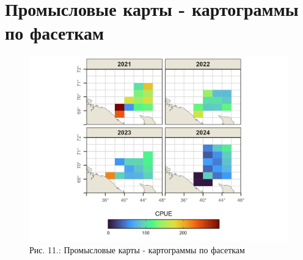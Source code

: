 \documentclass[
  letterpaper,
  DIV=11,
  numbers=noendperiod]{scrreprt}
\begin{document}
\section{Промысловые карты - картограммы по
фасеткам}\label{ux43fux440ux43eux43cux44bux441ux43bux43eux432ux44bux435-ux43aux430ux440ux442ux44b---ux43aux430ux440ux442ux43eux433ux440ux430ux43cux43cux44b-ux43fux43e-ux444ux430ux441ux435ux442ux43aux430ux43c}

\begin{figure}[H]

{\centering \includegraphics[width=0.8\linewidth,height=\textheight,keepaspectratio]{images/KARTOGRAPH11.jpg}

}

\caption{Рис. 11.: Промысловые карты - картограммы по фасеткам}

\end{figure}%
\end{document}
